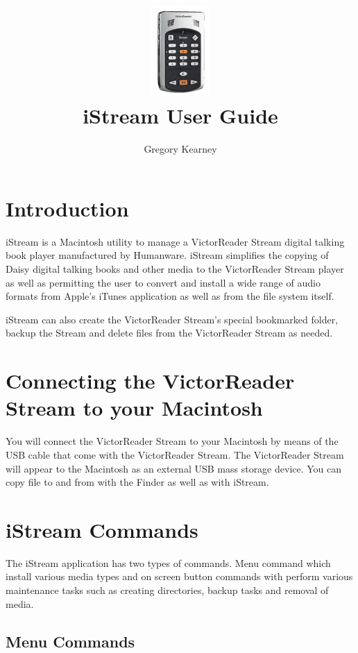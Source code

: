 \documentclass[12pt]{article}
\title{
   \includegraphics{vrstream.jpg} \\
   iStream User Guide}
\author{Gregory Kearney}
\begin{document}
\maketitle
\tableofcontents

\section{Introduction}
iStream is a Macintosh utility to manage a VictorReader Stream digital talking book player manufactured by Humanware. iStream simplifies the copying of Daisy digital talking books and other media to the VictorReader Stream player as well as permitting the user to convert and install a wide range of audio formats from Apple's iTunes application as well as from the file system itself.

iStream can also create the VictorReader Stream's special bookmarked folder, backup the Stream and delete files from the VictorReader Stream as needed.

\section{Connecting the VictorReader Stream to your Macintosh}
You will connect the VictorReader Stream to your Macintosh by means of the USB cable that come with the VictorReader Stream. The VictorReader Stream will appear to the Macintosh as an external USB mass storage device. You can copy file to and from with the Finder as well as with iStream.

\section{iStream Commands}
The iStream application has two types of commands. Menu command which install various media types and on screen button commands with perform various maintenance tasks such as creating directories, backup tasks and removal of media.
\subsection{Menu Commands}
\end{document}
